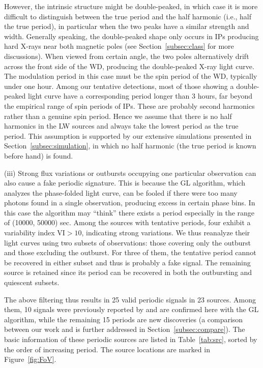 \documentclass[fleqn,usenatbib]{mnras}
\begin{document}
However, the intrinsic structure might be double-peaked, in which case it is more difficult to distinguish between the true period and the half harmonic (i.e., half the true period), in particular when the two peaks have a similar strength and width.
Generally speaking, the double-peaked shape only occurs in IPs producing hard X-rays near both magnetic poles (see Section~\ref{subsec:class} for more discussions). When viewed from certain angle, the two poles alternatively drift across the front side of the WD, producing the double-peaked X-ray light curve. The modulation period in this case must be the spin period of the WD, typically under one hour. Among our tentative detections, most of those showing a double-peaked light curve have a corresponding period longer than 3 hours, far beyond the empirical range of spin periods of IPs. 
These are probably second harmonics rather than a genuine spin period. 
Hence we assume that there is no half harmonics in the LW sources and always take the lowest period as the true period. This assumption is supported by our extensive simulations presented in Section~\ref{subsec:simulation}, in which no half harmonic (the true period is known before hand) is found.  

(iii) Strong flux variations or outbursts occupying one particular observation can also cause a fake periodic signature. This is because the GL algorithm, which analyzes the phase-folded light curve, can be fooled if there were too many photons found in a single observation, producing excess in certain phase bins. In this case the algorithm may ``think'' there exists a period especially in the range of (10000, 50000) sec. Among the sources with tentative periods, four exhibit a variability index VI$>10$, indicating strong variations. We thus reanalyze their light curves using two subsets of observations: those covering only the outburst and those excluding the outburst. For three of them, the tentative period cannot be recovered in either subset and thus is probably a fake signal. The remaining source is retained since its period can be recovered in both the outbursting and quiescent subsets.

The above filtering thus results in 25 valid periodic signals in 23 sources.
Among them, 10 signals were previously reported by \citet{2012ApJ...746..165H} and are confirmed here with the GL algorithm, while the remaining 15 periods are new discoveries (a comparison between our work and \citet{2012ApJ...746..165H} is further addressed in Section~\ref{subsec:compare}). 
The basic information of these periodic sources are listed in Table~\ref{tab:src}, sorted by the order of increasing period. The source locations are marked in Figure~\ref{fig:FoV}.
\end{document}
